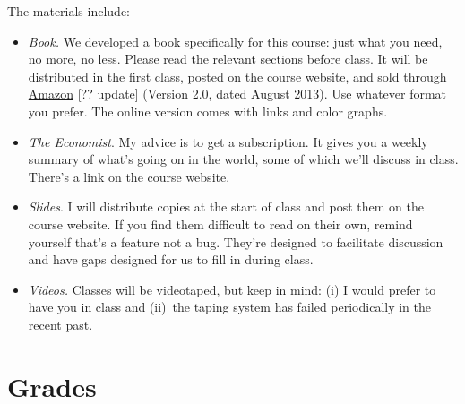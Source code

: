 \documentclass[12pt]{article}
\begin{document}
The materials include:
%
\begin{itemize}
\item {\it Book.\/}
We developed a book specifically for this course:
just what you need, no more, no less.
Please read the relevant sections before class.
It will be distributed in the first class,
posted on the course website,
and sold through
\href{http://www.amazon.com/dp/0615871038/}{Amazon} [?? update] 
(Version 2.0, dated August 2013).
Use whatever format you prefer.
The online version comes with links and color graphs.



\item {\it The Economist\/}.
My advice is to get a subscription.
It gives you a weekly summary of what's going on in the world,
some of which we'll discuss in class.
There's a link on the course website.

\item {\it Slides\/}.
I will distribute copies at the start of class and post them on the course website.
If you find them difficult to read on their own,
remind yourself that's a feature not a bug.
They're designed to facilitate discussion
and have gaps designed for us to fill in during class.

\item {\it Videos.\/}
Classes will be videotaped, but keep in mind:
(i) I would prefer to have you in class and
(ii)~the taping system has failed periodically in the recent past.

\end{itemize}


\section{Grades}
\end{document}
